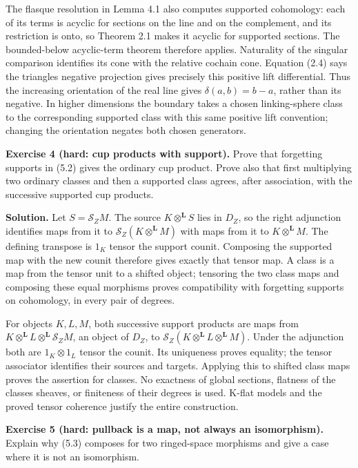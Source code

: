 \documentclass[
  english,
  11pt,
  a4paper,
]{article}
\begin{document}
The flasque resolution in Lemma 4.1 also computes supported cohomology:
each of its terms is acyclic for sections on the line and on the
complement, and its restriction is onto, so Theorem 2.1 makes it acyclic
for supported sections. The bounded-below acyclic-term theorem therefore
applies. Naturality of the singular comparison identifies its cone with
the relative cochain cone. Equation (2.4) says the
triangle\textquotesingle s negative projection gives precisely this
positive lift differential. Thus the increasing orientation of the real
line gives \(\delta(a,b)=b-a\), rather than its negative. In higher
dimensions the boundary takes a chosen linking-sphere class to the
corresponding supported class with this same positive lift convention;
changing the orientation negates both chosen generators.

\textbf{Exercise 4 (hard: cup products with support).} Prove that
forgetting supports in (5.2) gives the ordinary cup product. Prove also
that first multiplying two ordinary classes and then a supported class
agrees, after association, with the successive supported cup products.

\textbf{Solution.} Let \(S=\mathcal S_ZM\). The source
\(K\otimes^{\mathbf L}S\) lies in \(D_Z\), so the right adjunction
identifies maps from it to \(\mathcal S_Z(K\otimes^{\mathbf L}M)\) with
maps from it to \(K\otimes^{\mathbf L}M\). The defining transpose is
\(1_K\) tensor the support counit. Composing the supported map with the
new counit therefore gives exactly that tensor map. A class is a map
from the tensor unit to a shifted object; tensoring the two class maps
and composing these equal morphisms proves compatibility with forgetting
supports on cohomology, in every pair of degrees.

For objects \(K,L,M\), both successive support products are maps from
\(K\otimes^{\mathbf L}L\otimes^{\mathbf L}\mathcal S_ZM\), an object of
\(D_Z\), to \(\mathcal S_Z(K\otimes^{\mathbf L}L\otimes^{\mathbf L}M)\).
Under the adjunction both are \(1_K\otimes1_L\) tensor the counit. Its
uniqueness proves equality; the tensor associator identifies their
sources and targets. Applying this to shifted class maps proves the
assertion for classes. No exactness of global sections, flatness of the
classes\textquotesingle{} sheaves, or finiteness of their degrees is
used. K-flat models and the proved tensor coherence justify the entire
construction.

\textbf{Exercise 5 (hard: pullback is a map, not always an
isomorphism).} Explain why (5.3) composes for two ringed-space morphisms
and give a case where it is not an isomorphism.
\end{document}
